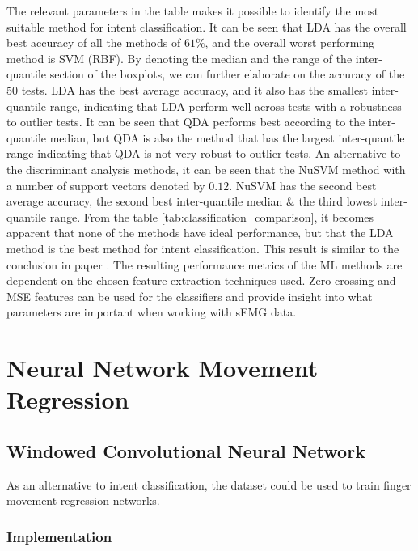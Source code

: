 \documentclass[../main.tex]{subfiles}
\begin{document}
The relevant parameters in the table makes it possible to identify the most suitable method for intent classification.
It can be seen that LDA has the overall best accuracy of all the methods of $61\%$, and the overall worst performing method is SVM (RBF).
By denoting the median and the range of the inter-quantile section of the boxplots, we can further elaborate on the accuracy of the 50 tests.
LDA has the best average accuracy, and it also has the smallest inter-quantile range, indicating that LDA perform well across tests with a robustness to outlier tests. 
It can be seen that QDA performs best according to the inter-quantile median, but QDA is also the method that has the largest inter-quantile range indicating that QDA is not very robust to outlier tests.
An alternative to the discriminant analysis methods, it can be seen that the NuSVM method with a number of support vectors denoted by $0.12$.
NuSVM has the second best average accuracy, the second best inter-quantile median \& the third lowest inter-quantile range.
From the table \ref{tab:classification_comparison}, it becomes apparent that none of the methods have ideal performance, but that the LDA method is the best method for intent classification.
This result is similar to the conclusion in paper \cite{KeunTaeKim2021}.
The resulting performance metrics of the ML methods are dependent on the chosen feature extraction techniques used.
Zero crossing and MSE features can be used for the classifiers and provide insight into what parameters are important when working with sEMG data.

\newpage
\section{Neural Network Movement Regression}
\label{sec:regression}

\subsection{Windowed Convolutional Neural Network}

As an alternative to intent classification, the dataset could be used to train finger movement regression networks.

\subsubsection{Implementation}
\end{document}
